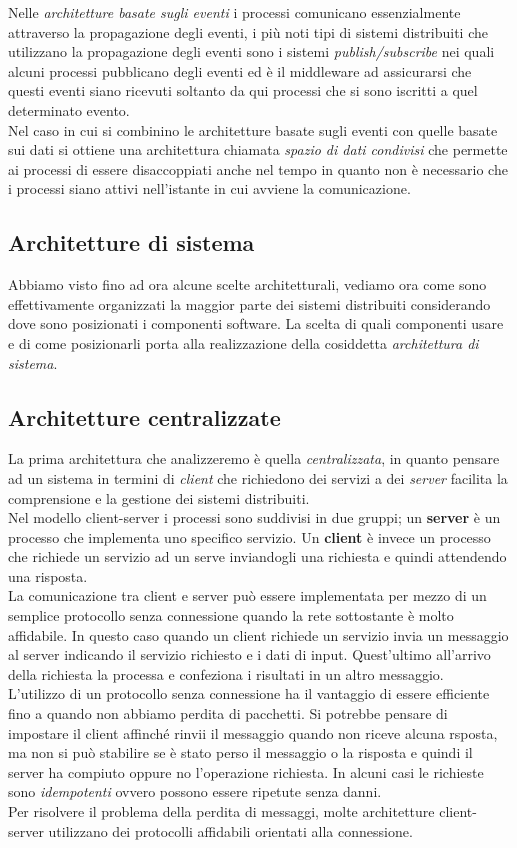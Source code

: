 Nelle \emph{architetture basate sugli eventi} i processi comunicano essenzialmente attraverso la propagazione degli eventi, i più noti tipi di sistemi distribuiti che utilizzano la propagazione degli eventi sono i sistemi \emph{publish/subscribe} nei quali alcuni processi pubblicano degli eventi ed è il middleware ad assicurarsi che questi eventi siano ricevuti soltanto da qui processi che si sono iscritti a quel determinato evento.\\
Nel caso in cui si combinino le architetture basate sugli eventi con quelle basate sui dati si ottiene una architettura chiamata \emph{spazio di dati condivisi} che permette ai processi di essere disaccoppiati anche nel tempo in quanto non è necessario che i processi siano attivi nell'istante in cui avviene la comunicazione.
\subsection{Architetture di sistema}
Abbiamo visto fino ad ora alcune scelte architetturali, vediamo ora come sono effettivamente organizzati la maggior parte dei sistemi distribuiti considerando dove sono posizionati i componenti software. La scelta di quali componenti usare e di come posizionarli porta alla realizzazione della cosiddetta \emph{architettura di sistema}.
\subsection{Architetture centralizzate}
La prima architettura che analizzeremo è quella \emph{centralizzata}, in quanto pensare ad un sistema in termini di \emph{client} che richiedono dei servizi a dei \emph{server} facilita la comprensione e la gestione dei sistemi distribuiti.\\
Nel modello client-server i processi sono suddivisi in due gruppi; un \textbf{server} è un processo che implementa uno specifico servizio. Un \textbf{client} è invece un processo che richiede un servizio ad un serve inviandogli una richiesta e quindi attendendo una risposta.\\
La comunicazione tra client e server può essere implementata per mezzo di un semplice protocollo senza connessione quando la rete sottostante è molto affidabile. In questo caso quando un client richiede un servizio invia un messaggio al server indicando il servizio richiesto e i dati di input. Quest'ultimo all'arrivo della richiesta la processa e confeziona i risultati in un altro messaggio.\\
L'utilizzo di un protocollo senza connessione ha il vantaggio di essere efficiente fino a quando non abbiamo perdita di pacchetti. Si potrebbe pensare di impostare il client affinché rinvii il messaggio quando non riceve alcuna rsposta, ma non si può stabilire se è stato perso il messaggio o la risposta e quindi il server ha compiuto oppure no l'operazione richiesta. In alcuni casi le richieste sono \emph{idempotenti} ovvero possono essere ripetute senza danni.\\
Per risolvere il problema della perdita di messaggi, molte architetture client-server utilizzano dei protocolli affidabili orientati alla connessione.
